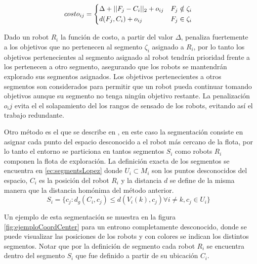 \begin{equation}\label{ec:costsolanas}
costo_{ij} = 
\begin{dcases}
  \Delta + || F_j - C_i ||_2 + o_{ij} & F_j \notin \zeta_i \\
  d(F_j, C_i) + o_{ij}                & F_j \in    \zeta_i
\end{dcases}
\end{equation}

Dado un robot $R_i$ la función de costo, a partir del valor $\Delta$, penaliza fuertemente a los objetivos que no pertenecen al segmento $\zeta_i$ asignado a $R_i$, por lo tanto los objetivos pertenecientes al segmento asignado al robot tendrán prioridad frente a los pertenecen a otro segmento, asegurando que los robots se mantendrán explorado sus segmentos asignados. Los objetivos pertenecientes a otros segmentos son considerados para permitir que un robot pueda continuar tomando objetivos aunque su segmento no tenga ningún objetivo restante. La penalización $o_ij$ evita el el solapamiento del los rangos de sensado de los robots, evitando así el trabajo redundante.\medbreak

Otro método es el que se describe en \cite{Lopez-Perez2018}, en este caso la segmentación consiste en asignar cada punto del espacio desconocido a el robot más cercano de la flota, por lo tanto el entorno se particiona en tantos segmentos $S_i$ como robots $R_i$ componen la flota de exploración. La definición exacta de los segmentos se encuentra en \eqref{ec:segmentsLopez} donde $U_i \subset M_i$ son los puntos desconocidos del espacio, $C_i$ es la posición del robot $R_i$ y la distancia $d$ se define de la misma manera que la distancia homónima del método anterior.
\begin{equation}\label{ec:segmentsLopez}
  S_i=\{c_j:d_g(C_i,c_j)\leq d(V_i(k),c_j) \forall i \neq k , c_j \in U_i\}
\end{equation}


Un ejemplo de esta segmentación se muestra en la figura \ref{fig:ejemploCoordCenter} para un entrono completamente desconocido, donde se puede visualizar las posiciones de los robots y con colores se indican los distintos segmentos. Notar que por la definición de segmento cada robot $R_i$ se encuentra dentro del segmento $S_i$ que fue definido a partir de su ubicación $C_i$. %

